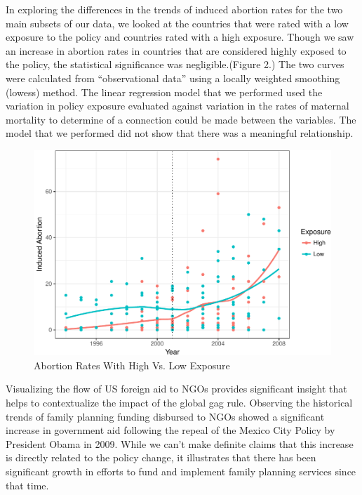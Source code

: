 \documentclass[11pt,]{article}
\makeatletter
\def\maxwidth{\ifdim\Gin@nat@width>\linewidth\linewidth
\else\Gin@nat@width\fi}
\let\Oldincludegraphics\includegraphics
\renewcommand{\includegraphics}[1]{\Oldincludegraphics[width=\maxwidth]{#1}}
\makeatother
\begin{document}
In exploring the differences in the trends of induced abortion rates for
the two main subsets of our data, we looked at the countries that were
rated with a low exposure to the policy and countries rated with a high
exposure. Though we saw an increase in abortion rates in countries that
are considered highly exposed to the policy, the statistical
significance was negligible.(Figure 2.) The two curves were calculated
from ``observational data'' using a locally weighted smoothing (lowess)
method. The linear regression model that we performed used the variation
in policy exposure evaluated against variation in the rates of maternal
mortality to determine of a connection could be made between the
variables. The model that we performed did not show that there was a
meaningful relationship.

\begin{figure}
\centering
\includegraphics{final-paper_files/figure-latex/unnamed-chunk-2-1.pdf}
\caption{Abortion Rates With High Vs. Low Exposure}
\end{figure}

Visualizing the flow of US foreign aid to NGOs provides significant
insight that helps to contextualize the impact of the global gag rule.
Observing the historical trends of family planning funding disbursed to
NGOs showed a significant increase in government aid following the
repeal of the Mexico City Policy by President Obama in 2009. While we
can't make definite claims that this increase is directly related to the
policy change, it illustrates that there has been significant growth in
efforts to fund and implement family planning services since that time.
\end{document}
